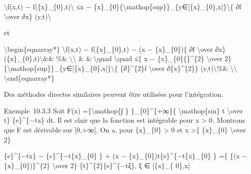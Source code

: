 \documentclass[]{article}
\begin{document}
\textbackslash{}\textbar{}f(x,t) −
f(\{x\}\_\{0\},t)\textbackslash{}\textbar{} ≤\textbar{}x −
\{x\}\_\{0\}\textbar{}\{\textbackslash{}mathop\{sup\}\}\_\{y∈{[}\{x\}\_\{0\},x{]}\}\textbackslash{}\textbar{}\{
∂f \textbackslash{}over ∂x\} (y,t)\textbackslash{}\textbar{}

et

\textbackslash{}begin\{eqnarray*\} \textbackslash{}\textbar{}f(x,t) −
f(\{x\}\_\{0\},t) − (x − \{x\}\_\{0\})\{ ∂f \textbackslash{}over ∂x\}
(\{x\}\_\{0\},t)\textbackslash{}\textbar{}\&\& \%\&
\textbackslash{}\textbackslash{} \& \& \textbackslash{}quad
\textbackslash{}quad ≤\{ \textbar{}x −
\{x\}\_\{0\}\{\textbar{}\}\^{}\{2\} \textbackslash{}over 2\}
\{\textbackslash{}mathop\{sup\}\}\_\{y∈{[}\{x\}\_\{0\},x{]}\}\textbackslash{}\textbar{}\{
\{∂\}\^{}\{2\}f \textbackslash{}over ∂\{x\}\^{}\{2\}\}
(y,t)\textbackslash{}\textbar{}\%\& \textbackslash{}\textbackslash{}
\textbackslash{}end\{eqnarray*\}

Des méthodes directes similaires peuvent être utilisées pour
l'intégration.

Exemple~10.3.3 Soit F(x) =\{\textbackslash{}mathop\{∫ \}
\}\_\{0\}\^{}\{+∞\}\{ \textbackslash{}mathop\{sin\} t
\textbackslash{}over t\} \{e\}\^{}\{−tx\} dt. Il est clair que la
fonction est intégrable pour x \textgreater{} 0. Montrons que F est
dérivable sur {]}0,+∞{[}. On a, pour \{x\}\_\{0\} \textgreater{} 0 et x
\textgreater{}\{ \{x\}\_\{0\} \textbackslash{}over 2\}

\{e\}\^{}\{−tx\} − \{e\}\^{}\{−t\{x\}\_\{0\} \} + (x −
\{x\}\_\{0\})t\{e\}\^{}\{−t\{x\}\_\{0\} \} =\{ \{(x −
\{x\}\_\{0\})\}\^{}\{2\} \textbackslash{}over 2\}
\{t\}\^{}\{2\}\{e\}\^{}\{−tξ\}, ξ ∈ {[}\{x\}\_\{ 0\},x{]}
\end{document}
